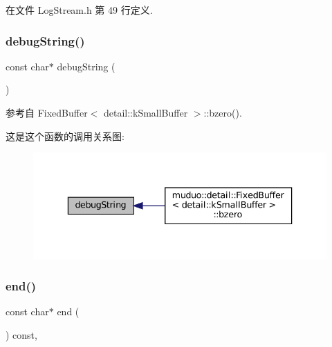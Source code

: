 在文件 Log\+Stream.\+h 第 49 行定义.

\mbox{\label{classmuduo_1_1detail_1_1FixedBuffer_a8f912ff009070cb5dcce97612fcda401}} 
\subsubsection{\texorpdfstring{debug\+String()}{debugString()}}
{\footnotesize\ttfamily const char$\ast$ debug\+String (\begin{DoxyParamCaption}{ }\end{DoxyParamCaption})}



参考自 Fixed\+Buffer$<$ detail\+::k\+Small\+Buffer $>$\+::bzero().

这是这个函数的调用关系图\+:
\nopagebreak
\begin{figure}[H]
\begin{center}
\leavevmode
\includegraphics[width=336pt]{classmuduo_1_1detail_1_1FixedBuffer_a8f912ff009070cb5dcce97612fcda401_icgraph}
\end{center}
\end{figure}
\mbox{\label{classmuduo_1_1detail_1_1FixedBuffer_a8f7e2912f169cf1aa7eeaec74b5fd151}} 
\subsubsection{\texorpdfstring{end()}{end()}}
{\footnotesize\ttfamily const char$\ast$ end (\begin{DoxyParamCaption}{ }\end{DoxyParamCaption}) const\hspace{0.3cm}{\ttfamily [inline]}, {\ttfamily [private]}}



